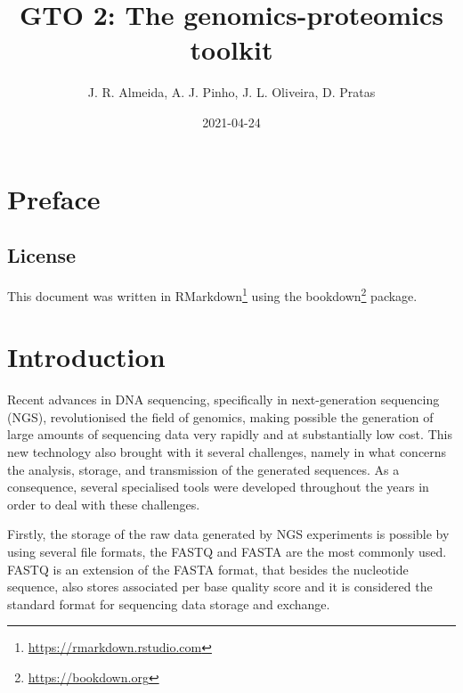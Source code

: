 \documentclass[11pt,]{krantz}
\title{GTO 2: The genomics-proteomics toolkit}
\author{J. R. Almeida, A. J. Pinho, J. L. Oliveira, D. Pratas}
\date{2021-04-24}
\renewcommand{\href}[2]{#2\footnote{\url{#1}}}
\begin{document}
\maketitle

{
\hypersetup{linkcolor=black}
\setcounter{tocdepth}{1}
\tableofcontents
}
\listoftables
\listoffigures
\chapter*{Preface}\label{preface}


\section*{License}\label{license}


This document was written in
\href{https://rmarkdown.rstudio.com}{RMarkdown} using the
\href{https://bookdown.org}{bookdown} package.

\mainmatter

\chapter{Introduction}\label{introduction}

Recent advances in DNA sequencing, specifically in next-generation
sequencing (NGS), revolutionised the field of genomics, making possible
the generation of large amounts of sequencing data very rapidly and at
substantially low cost\citep{mardis2017dna}. This new technology also
brought with it several challenges, namely in what concerns the
analysis, storage, and transmission of the generated
sequences\citep[\citet{liu2012comparison}]{brouwer2016current}. As a
consequence, several specialised tools were developed throughout the
years in order to deal with these challenges.

Firstly, the storage of the raw data generated by NGS experiments is
possible by using several file formats, the FASTQ and FASTA are the most
commonly used\citep{zhang2016overview}. FASTQ is an extension of the
FASTA format, that besides the nucleotide sequence, also stores
associated per base quality score and it is considered the standard
format for sequencing data storage and exchange\citep{cock2009sanger}.
\end{document}
